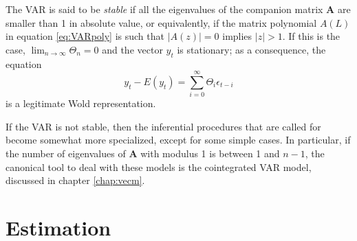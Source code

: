 The VAR is said to be \emph{stable} if all the eigenvalues of the
companion matrix $\mathbf{A}$ are smaller than 1 in absolute value, or
equivalently, if the matrix polynomial $A(L)$ in equation
\eqref{eq:VARpoly} is such that $|A(z)| = 0$ implies $|z|>1$. If this
is the case, $\lim_{n \to \infty} \Theta_n = 0$ and the vector $y_t$ is
stationary; as a consequence, the equation
\begin{equation}
  \label{eq:VMArep}
  y_t - E(y_t) = \sum_{i=0}^{\infty} \Theta_i \epsilon_{t-i}
\end{equation}
is a legitimate Wold representation. 

If the VAR is not stable, then the inferential procedures that are
called for become somewhat more specialized, except for some simple
cases. In particular, if the number of eigenvalues of $\mathbf{A}$
with modulus 1 is between 1 and $n-1$, the canonical tool to deal with
these models is the cointegrated VAR model, discussed in chapter
\ref{chap:vecm}.

\section{Estimation}
\label{sec:var-estim}

